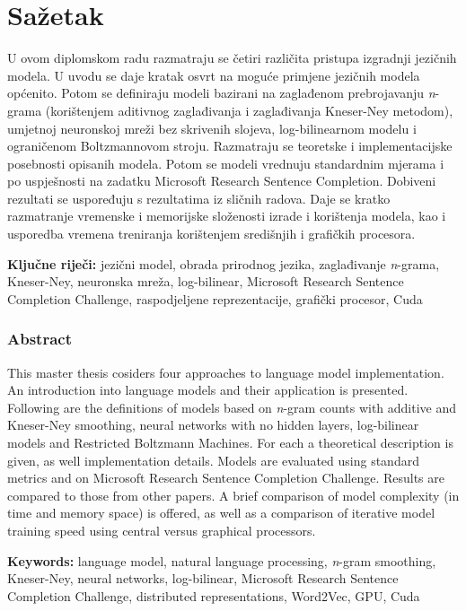\documentclass[times, utf8, diplomski, numeric]{fer}
\begin{document}



\chapter{Sažetak}

U ovom diplomskom radu razmatraju se četiri različita pristupa izgradnji jezičnih modela. U uvodu se daje kratak osvrt na moguće primjene jezičnih modela općenito. Potom se definiraju modeli bazirani na zaglađenom prebrojavanju \textit{n}-grama (korištenjem aditivnog zaglađivanja i zaglađivanja Kneser-Ney metodom), umjetnoj neuronskoj mreži bez skrivenih slojeva, log-bilinearnom modelu i ograničenom Boltzmannovom stroju. Razmatraju se teoretske i implementacijske posebnosti opisanih modela. Potom se modeli vrednuju standardnim mjerama i po uspješnosti na zadatku Microsoft Research Sentence Completion. Dobiveni rezultati se uspoređuju s rezultatima iz sličnih radova. Daje se kratko razmatranje vremenske i memorijske složenosti izrade i korištenja modela, kao i usporedba vremena treniranja korištenjem središnjih i grafičkih procesora.

\textbf{Ključne riječi:} jezični model, obrada prirodnog jezika, zaglađivanje \textit{n}-grama, Kneser-Ney, neuronska mreža, log-bilinear, Microsoft Research Sentence Completion Challenge, raspodjeljene reprezentacije, grafički procesor, Cuda

\subsection*{Abstract}

This master thesis cosiders four approaches to language model implementation. An introduction into language models and their application is presented. Following are the definitions of models based on \textit{n}-gram counts with additive and Kneser-Ney smoothing, neural networks with no hidden layers, log-bilinear models and Restricted Boltzmann Machines. For each a theoretical description is given, as well implementation details. Models are evaluated using standard metrics and on Microsoft Research Sentence Completion Challenge. Results are compared to those from other papers. A brief comparison of model complexity (in time and memory space) is offered, as well as a comparison of iterative model training speed using central versus graphical processors.

\textbf{Keywords:} language model, natural language processing, \textit{n}-gram smoothing, Kneser-Ney, neural networks, log-bilinear, Microsoft Research Sentence Completion Challenge, distributed representations, Word2Vec, GPU, Cuda
\end{document}
